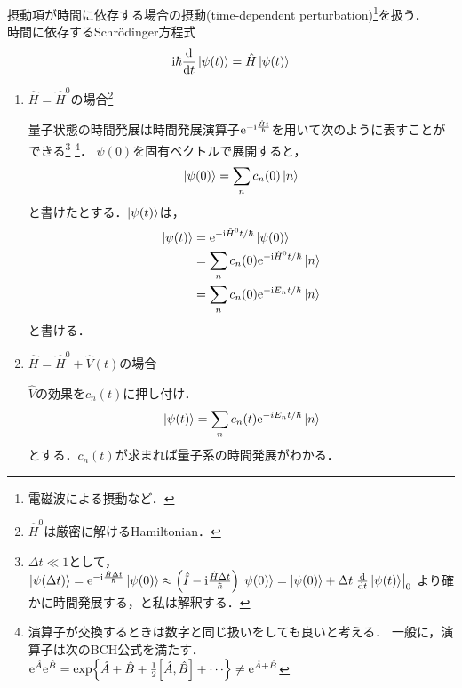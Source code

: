 \documentclass{report}
\begin{document}
  摂動項が時間に依存する場合の摂動(time-dependent perturbation)\footnote{電磁波による摂動など．}を扱う．\\
  時間に依存するSchrödinger方程式
  \begin{align}
    \mathrm{i}\hbar\dv{t}\ket{\psi(t)}  =  \hat{H}\ket{\psi(t)}
  \end{align}
  \begin{enumerate}
    \item $\hat{H} = \hat{H}^0$の場合\footnote{$\hat{H}^0$は厳密に解けるHamiltonian．}\par
      量子状態の時間発展は時間発展演算子$\mathrm{e}^{-\mathrm{i}\frac{\hat{H}t}{\hbar}}$を用いて次のように表すことができる\footnote{$\Delta t \ll 1$として，
        $
        \ket{\psi(\Delta t)} = \mathrm{e}^{-\mathrm{i}\frac{\hat{H}\Delta t}{\hbar}}\ket{\psi(0)} \approx\qty(\hat{I} - \mathrm{i}\frac{\hat{H}\Delta t}{\hbar})\ket{\psi(0)} 
        = \ket{\psi(0)} + \Delta t \left.\dv{t}\ket{\psi(t)}\right|_0
        $
        より確かに時間発展する，と私は解釈する．}
      \footnote{演算子が交換するときは数字と同じ扱いをしても良いと考える．
        一般に，演算子は次のBCH公式を満たす．
        $\mathrm{e}^{\hat{A}}\mathrm{e}^{\hat{B}} = \exp{\hat{A} + \hat{B} + \frac{1}{2}\qty[\hat{A},\hat{B}] + \cdots}\neq\mathrm{e}^{\hat{A} + \hat{B}}$
      }．
      $\psi(0)$を固有ベクトルで展開すると，
      \begin{align}
        \ket{\psi(0)} = \sum_{n}c_n(0)\ket{n}
      \end{align}
      と書けたとする．$\ket{\psi(t)}$は，
      \begin{align}
        \ket{\psi(t)}& = \mathrm{e}^{-\mathrm{i}\hat{H}^0t/\hbar}\ket{\psi(0)}\\
        & = \sum_{n}c_n(0)\mathrm{e}^{-\mathrm{i}\hat{H}^0t/\hbar}\ket{n}\\
        & = \sum_{n}c_n(0)\mathrm{e}^{-\mathrm{i} E_nt/\hbar}\ket{n}
      \end{align}
      と書ける．
    \item $\hat{H} = \hat{H}^0+\hat{V}(t)$の場合\par
      $\hat{V}$の効果を$c_n(t)$に押し付け．
      \begin{align}
        \ket{\psi(t)} = \sum_{n}c_n(t)\mathrm{e}^{-iE_nt/\hbar}\ket{n}
      \end{align}
      とする．$c_n(t)$が求まれば量子系の時間発展がわかる．
  \end{enumerate}
\end{document}
